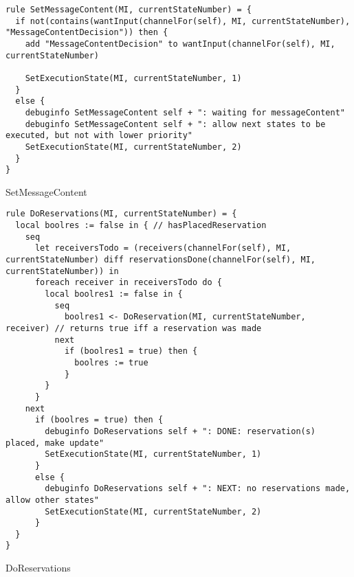 \begin{listing}[H]
\begin{verbatim}
rule SetMessageContent(MI, currentStateNumber) = {
  if not(contains(wantInput(channelFor(self), MI, currentStateNumber), "MessageContentDecision")) then {
    add "MessageContentDecision" to wantInput(channelFor(self), MI, currentStateNumber)

    SetExecutionState(MI, currentStateNumber, 1)
  }
  else {
    debuginfo SetMessageContent self + ": waiting for messageContent"
    debuginfo SetMessageContent self + ": allow next states to be executed, but not with lower priority"
    SetExecutionState(MI, currentStateNumber, 2)
  }
}
\end{verbatim}
\caption{SetMessageContent}
\label{lst:asm:SetMessageContent}
\end{listing}




\begin{listing}[H]
\begin{verbatim}
rule DoReservations(MI, currentStateNumber) = {
  local boolres := false in { // hasPlacedReservation
    seq
      let receiversTodo = (receivers(channelFor(self), MI, currentStateNumber) diff reservationsDone(channelFor(self), MI, currentStateNumber)) in
      foreach receiver in receiversTodo do {
        local boolres1 := false in {
          seq
            boolres1 <- DoReservation(MI, currentStateNumber, receiver) // returns true iff a reservation was made
          next
            if (boolres1 = true) then {
              boolres := true
            }
        }
      }
    next
      if (boolres = true) then {
        debuginfo DoReservations self + ": DONE: reservation(s) placed, make update"
        SetExecutionState(MI, currentStateNumber, 1)
      }
      else {
        debuginfo DoReservations self + ": NEXT: no reservations made, allow other states"
        SetExecutionState(MI, currentStateNumber, 2)
      }
  }
}
\end{verbatim}
\caption{DoReservations}
\label{lst:asm:DoReservations}
\end{listing}






